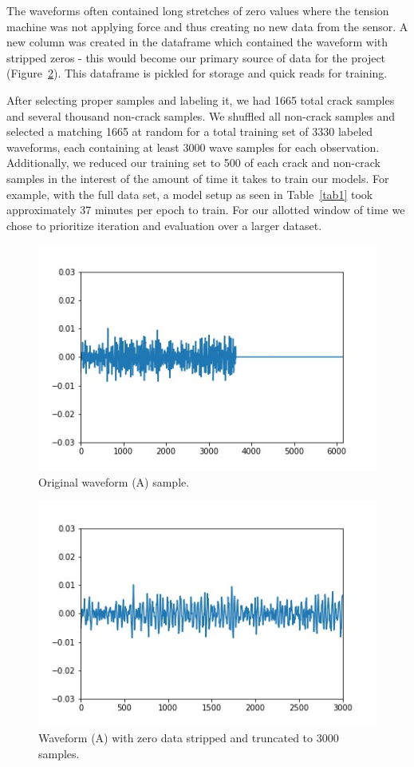 \documentclass[conference]{IEEEtran}
\begin{document}
The waveforms often contained long stretches of zero values where the tension machine was not applying force and thus creating no new data from the sensor. A new column was created in the dataframe which contained the waveform with stripped zeros - this would become our primary source of data for the project (Figure~\ref{waveform_noz}). This dataframe is pickled for storage and quick reads for training.

After selecting proper samples and labeling it, we had 1665 total crack samples and several thousand non-crack samples. We shuffled all non-crack samples and selected a matching 1665 at random for a total training set of 3330 labeled waveforms, each containing at least 3000 wave samples for each observation. Additionally, we reduced our training set to 500 of each crack and non-crack samples in the interest of the amount of time it takes to train our models. For example, with the full data set, a model setup as seen in Table~\ref{tab1} took approximately 37 minutes per epoch to train. For our allotted window of time we chose to prioritize iteration and evaluation over a larger dataset.

\begin{figure}[htbp]
\centerline{\includegraphics[width=.5\textwidth]{images/data/waveform_153_zeros.jpg}}
\caption{Original waveform (A) sample.}
\label{waveform}
\end{figure}

\begin{figure}[htbp]
\centerline{\includegraphics[width=.5\textwidth]{images/data/waveform_153_nozeros.jpg}}
\caption{Waveform (A) with zero data stripped and truncated to 3000 samples.}
\label{waveform_noz}
\end{figure}
\end{document}
